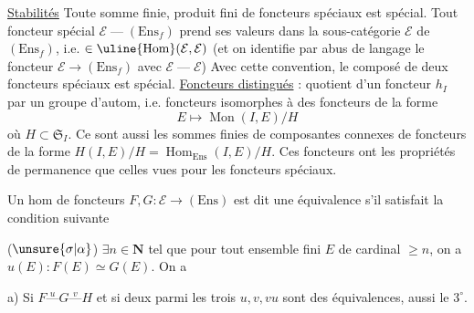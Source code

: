 \uline{Stabilités} Toute somme finie,  produit
fini  de foncteurs spéciaux est spécial.
Tout foncteur spécial $\mathcal E\mathbin{\text{---}}(\mathrm{Ens}_f)$ prend
ses valeurs dans la sous-catégorie
$\mathcal E$ de $(\mathrm{Ens}_f)$, i.e.  $\in\uline{\operatorname{Hom}}(\mathcal E,\mathcal E)$
(et on identifie par abus de langage
le foncteur $\mathcal E\longrightarrow(\mathrm{Ens}_f)$ avec $\mathcal E\mathbin{\text{---}}\mathcal E$)
Avec cette convention, le composé de
deux foncteurs spéciaux est spécial.
\uline{Foncteurs distingués} :  quotient d'un foncteur
 $h_I$ par un groupe d'autom, i.e.
foncteurs isomorphes à des  foncteurs de la
forme
\[
E\longmapsto\operatorname{Mon}(I,E)/H
\]
où $H\subset\mathfrak S_I$. Ce sont aussi les sommes
finies de composantes connexes de foncteurs
de la forme $H(I,E)/H=\operatorname{Hom}_{\mathrm{Ens}}(I,E)/H$.
Ces foncteurs ont les  propriétés de
permanence que celles vues pour les
foncteurs spéciaux.


Un hom  de foncteurs $F,G:\mathcal E\longrightarrow(\mathrm{Ens})$
est dit une équivalence s'il satisfait la
condition suivante

($\unsure{\sigma|\alpha}$) $\exists n\in\mathbf N$ tel que pour  tout
ensemble fini $E$  de cardinal $\geq n$, 
on a $u(E):F(E)\simeq G(E)$. On a

a) Si $F\mathrel{\overset{u}{\text{---}}}G\mathrel{\overset{v}{\text{---}}}H$ et si deux parmi les
trois $u,v,vu$ sont des équivalences, aussi le $3^\circ$.

